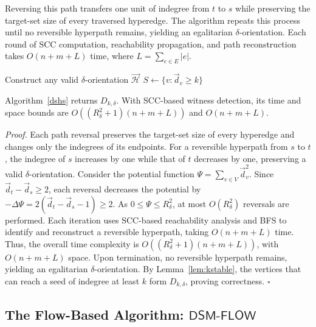 \documentclass[twocolumn]{svjour3}
\newcommand{\kw}[1]{{\ensuremath{\mathsf{#1}}}\xspace}
\begin{document}
Reversing this path transfers one unit of indegree from $t$ to $s$ while preserving the target-set size of every traversed hyperedge. The algorithm repeats this process until no reversible hyperpath remains, yielding an egalitarian $\delta$-orientation. Each round of SCC computation, reachability propagation, and path reconstruction takes $O(n+m+L)$ time, where $L=\sum_{e\in E}|e|$.


\begin{algorithm}[t]
\small
\caption{$\kw{DSM\text{-}PATH}(\mathcal H,k,\delta)$}\label{dshs}
Construct any valid $\delta$-orientation $\vec{\mathcal H}$\;
$S\gets\{v:\vec d_v\ge k\}$\;
\;
\end{algorithm}
\begin{theorem}\label{comdshs}
Algorithm~\ref{dshs} returns $D_{k,\delta}$. With SCC-based witness detection, its time and space bounds are $O((R_\delta^2+1)(n+m+L))$ and $O(n+m+L)$.
\end{theorem}

\emph{Proof.}
Each path reversal preserves the target-set size of every hyperedge and changes only the indegrees of its endpoints. For a reversible hyperpath from $s$ to $t$, the indegree of $s$ increases by one while that of $t$ decreases by one, preserving a valid $\delta$-orientation.
Consider the potential function $\Psi=\sum_{v\in V}\vec d_v^2$. Since $\vec d_t-\vec d_s\ge2$, each reversal decreases the potential by
$-\Delta\Psi=2(\vec d_t-\vec d_s-1)\ge2$.
As $0\le\Psi\le R_\delta^2$, at most $O(R_\delta^2)$ reversals are performed. Each iteration uses SCC-based reachability analysis and BFS to identify and reconstruct a reversible hyperpath, taking $O(n+m+L)$ time. Thus, the overall time complexity is $O((R_\delta^2+1)(n+m+L))$, with $O(n+m+L)$ space.
Upon termination, no reversible hyperpath remains, yielding an egalitarian $\delta$-orientation. By Lemma~\ref{lem:kstable}, the vertices that can reach a seed of indegree at least $k$ form $D_{k,\delta}$, proving correctness.
\hfill$\square$

\subsection{The Flow-Based Algorithm: $\kw{DSM\text{-}FLOW}$}
\label{subsec:dsm-flow}
\end{document}
